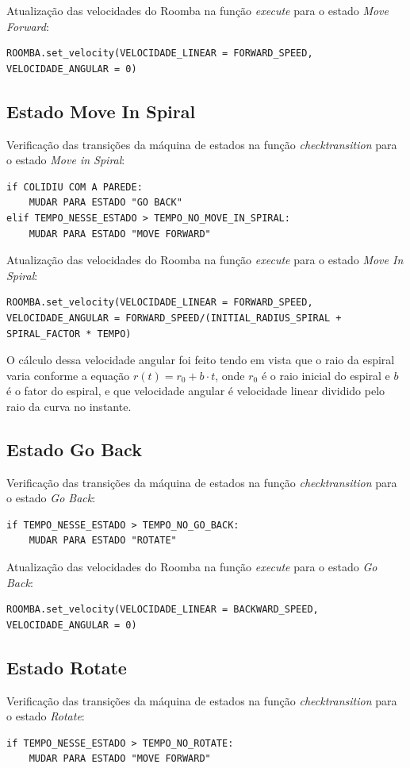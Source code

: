 \documentclass[conference]{IEEEtran}
\begin{document}
Atualização das velocidades do Roomba na função \textit{execute} para o estado \textit{Move Forward}:
\begin{lstlisting}
ROOMBA.set_velocity(VELOCIDADE_LINEAR = FORWARD_SPEED, VELOCIDADE_ANGULAR = 0)
\end{lstlisting}

\subsection{Estado Move In Spiral}
Verificação das transições da máquina de estados na função \textit{check\underline{\space}transition} para o estado \textit{Move in Spiral}:
\begin{lstlisting}
if COLIDIU COM A PAREDE:
	MUDAR PARA ESTADO "GO BACK"
elif TEMPO_NESSE_ESTADO > TEMPO_NO_MOVE_IN_SPIRAL:
	MUDAR PARA ESTADO "MOVE FORWARD"
\end{lstlisting}

Atualização das velocidades do Roomba na função \textit{execute} para o estado \textit{Move In Spiral}:
\begin{lstlisting}
ROOMBA.set_velocity(VELOCIDADE_LINEAR = FORWARD_SPEED, VELOCIDADE_ANGULAR = FORWARD_SPEED/(INITIAL_RADIUS_SPIRAL + SPIRAL_FACTOR * TEMPO)
\end{lstlisting}

O cálculo dessa velocidade angular foi feito tendo em vista que o raio da espiral varia conforme a equação $r(t) = r_0 + b \cdot t$, onde $r_0$ é o raio inicial do espiral e $b$ é o fator do espiral, e que velocidade angular é velocidade linear dividido pelo raio da curva no instante.

\subsection{Estado Go Back}
Verificação das transições da máquina de estados na função \textit{check\underline{\space}transition} para o estado \textit{Go Back}:
\begin{lstlisting}
if TEMPO_NESSE_ESTADO > TEMPO_NO_GO_BACK:
	MUDAR PARA ESTADO "ROTATE"
\end{lstlisting}

Atualização das velocidades do Roomba na função \textit{execute} para o estado \textit{Go Back}:
\begin{lstlisting}
ROOMBA.set_velocity(VELOCIDADE_LINEAR = BACKWARD_SPEED, VELOCIDADE_ANGULAR = 0)
\end{lstlisting}

\subsection{Estado Rotate}
Verificação das transições da máquina de estados na função \textit{check\underline{\space}transition} para o estado \textit{Rotate}:
\begin{lstlisting}
if TEMPO_NESSE_ESTADO > TEMPO_NO_ROTATE:
	MUDAR PARA ESTADO "MOVE FORWARD"
\end{lstlisting}
\end{document}
